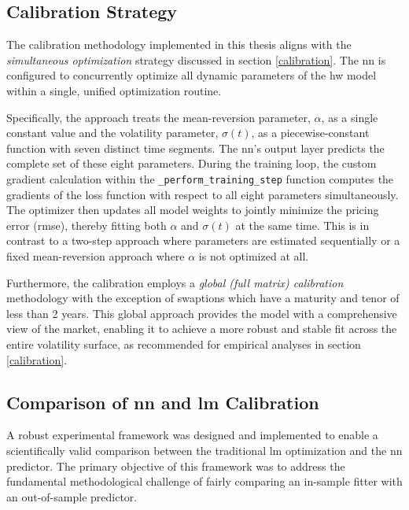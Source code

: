 \subsection{Calibration Strategy}
The calibration methodology implemented in this thesis aligns with the \textit{simultaneous optimization} strategy discussed in section \ref{calibration}. The \ac{nn} is configured to concurrently optimize all dynamic parameters of the \ac{hw} model within a single, unified optimization routine.

Specifically, the approach treats the mean-reversion parameter, $\alpha$, as a single constant value and the volatility parameter, $\sigma(t)$, as a piecewise-constant function with seven distinct time segments. The \ac{nn}'s output layer predicts the complete set of these eight parameters. During the training loop, the custom gradient calculation within the \texttt{\_perform\_training\_step} function computes the gradients of the loss function with respect to all eight parameters simultaneously. The optimizer then updates all model weights to jointly minimize the pricing error (\ac{rmse}), thereby fitting both $\alpha$ and $\sigma(t)$ at the same time. This is in contrast to a two-step approach where parameters are estimated sequentially or a fixed mean-reversion approach where $\alpha$ is not optimized at all.

Furthermore, the calibration employs a \textit{global (full matrix) calibration} methodology with the exception of swaptions which have a maturity and tenor of less than 2 years. This global approach provides the model with a comprehensive view of the market, enabling it to achieve a more robust and stable fit across the entire volatility surface, as recommended for empirical analyses in section \ref{calibration}.

\subsection{Comparison of \ac{nn} and \ac{lm} Calibration}
\label{subsec:comparison_of_nn_and_lm}
A robust experimental framework was designed and implemented to enable a scientifically valid comparison between the traditional \ac{lm} optimization and the \ac{nn} predictor. The primary objective of this framework was to address the fundamental methodological challenge of fairly comparing an in-sample fitter with an out-of-sample predictor.

